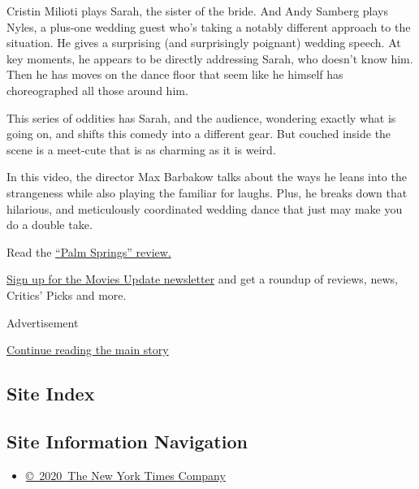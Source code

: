 Cristin Milioti plays Sarah, the sister of the bride. And Andy Samberg
plays Nyles, a plus-one wedding guest who's taking a notably different
approach to the situation. He gives a surprising (and surprisingly
poignant) wedding speech. At key moments, he appears to be directly
addressing Sarah, who doesn't know him. Then he has moves on the dance
floor that seem like he himself has choreographed all those around him.

This series of oddities has Sarah, and the audience, wondering exactly
what is going on, and shifts this comedy into a different gear. But
couched inside the scene is a meet-cute that is as charming as it is
weird.

In this video, the director Max Barbakow talks about the ways he leans
into the strangeness while also playing the familiar for laughs. Plus,
he breaks down that hilarious, and meticulously coordinated wedding
dance that just may make you do a double take.

Read the
\href{https://www.nytimes.com/2020/07/09/movies/palm-springs-review.html}{``Palm
Springs'' review.}

\href{https://www.nytimes.com/newsletters/moviesupdate?module=inline}{Sign
up for the Movies Update newsletter} and get a roundup of reviews, news,
Critics' Picks and more.

Advertisement

\protect\hyperlink{after-bottom}{Continue reading the main story}

\hypertarget{site-index}{%
\subsection{Site Index}\label{site-index}}

\hypertarget{site-information-navigation}{%
\subsection{Site Information
Navigation}\label{site-information-navigation}}

\begin{itemize}
\tightlist
\item
  \href{https://help.nytimes.com/hc/en-us/articles/115014792127-Copyright-notice}{©~2020~The
  New York Times Company}
\end{itemize}

